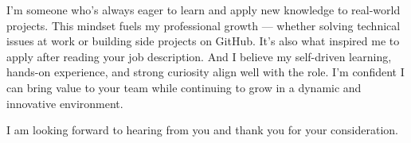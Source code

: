 \documentclass[11pt, a4paper]{awesome-cv}
\begin{document}
\begin{cvletter}
I’m someone who’s always eager to learn and apply new knowledge to real-world projects. This mindset fuels my professional growth — whether solving technical issues at work or building side projects on GitHub. It’s also what inspired me to apply after reading your job description. And I believe my self-driven learning, hands-on experience, and strong curiosity align well with the role. I’m confident I can bring value to your team while continuing to grow in a dynamic and innovative environment.

I am looking forward to hearing from you and thank you for your consideration.
\end{cvletter}



\makeletterclosing
\end{document}
